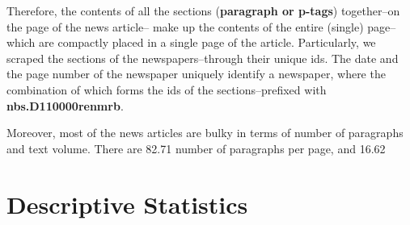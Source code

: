 \documentclass[12pt,a4paper]{article}
\begin{document}
Therefore, the contents of all the sections (\textbf{paragraph or p-tags}) together--on the page of the news article-- make up the contents of the entire (single) page--which are compactly placed in a single page of the article. Particularly, we scraped the sections of the newspapers--through their unique ids. The date and the page number of the newspaper uniquely identify a newspaper, where the combination of which forms the ids of the sections--prefixed with \textbf{nbs.D110000renmrb}.

Moreover, most of the news articles are bulky in terms of number of paragraphs and text volume. There are 82.71 number of paragraphs per page, and 16.62

\hypertarget{descriptive-statistics}{%
\section{Descriptive Statistics}\label{descriptive-statistics}}
\end{document}
